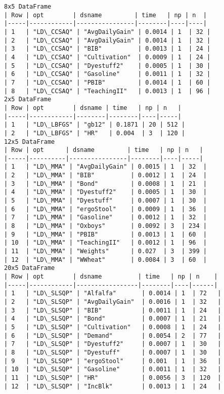 \documentclass{article}
\begin{document}
    \begin{Verbatim}[commandchars=\\\{\}]
8x5 DataFrame
| Row | opt        | dsname         | time   | np | n  |
|-----|------------|----------------|--------|----|----|
| 1   | "LD\_CCSAQ" | "AvgDailyGain" | 0.0014 | 1  | 32 |
| 2   | "LD\_CCSAQ" | "AvgDailyGain" | 0.0014 | 1  | 32 |
| 3   | "LD\_CCSAQ" | "BIB"          | 0.0013 | 1  | 24 |
| 4   | "LD\_CCSAQ" | "Cultivation"  | 0.0009 | 1  | 24 |
| 5   | "LD\_CCSAQ" | "Dyestuff2"    | 0.0005 | 1  | 30 |
| 6   | "LD\_CCSAQ" | "Gasoline"     | 0.0011 | 1  | 32 |
| 7   | "LD\_CCSAQ" | "PBIB"         | 0.0014 | 1  | 60 |
| 8   | "LD\_CCSAQ" | "TeachingII"   | 0.0013 | 1  | 96 |
2x5 DataFrame
| Row | opt        | dsname | time   | np | n   |
|-----|------------|--------|--------|----|-----|
| 1   | "LD\_LBFGS" | "gb12" | 0.1871 | 20 | 512 |
| 2   | "LD\_LBFGS" | "HR"   | 0.004  | 3  | 120 |
12x5 DataFrame
| Row | opt      | dsname         | time   | np | n   |
|-----|----------|----------------|--------|----|-----|
| 1   | "LD\_MMA" | "AvgDailyGain" | 0.0015 | 1  | 32  |
| 2   | "LD\_MMA" | "BIB"          | 0.0012 | 1  | 24  |
| 3   | "LD\_MMA" | "Bond"         | 0.0008 | 1  | 21  |
| 4   | "LD\_MMA" | "Dyestuff2"    | 0.0005 | 1  | 30  |
| 5   | "LD\_MMA" | "Dyestuff"     | 0.0007 | 1  | 30  |
| 6   | "LD\_MMA" | "ergoStool"    | 0.0009 | 1  | 36  |
| 7   | "LD\_MMA" | "Gasoline"     | 0.0012 | 1  | 32  |
| 8   | "LD\_MMA" | "Oxboys"       | 0.0092 | 3  | 234 |
| 9   | "LD\_MMA" | "PBIB"         | 0.0013 | 1  | 60  |
| 10  | "LD\_MMA" | "TeachingII"   | 0.0012 | 1  | 96  |
| 11  | "LD\_MMA" | "Weights"      | 0.027  | 3  | 399 |
| 12  | "LD\_MMA" | "WWheat"       | 0.0084 | 3  | 60  |
20x5 DataFrame
| Row | opt        | dsname          | time   | np | n    |
|-----|------------|-----------------|--------|----|------|
| 1   | "LD\_SLSQP" | "Alfalfa"       | 0.0014 | 1  | 72   |
| 2   | "LD\_SLSQP" | "AvgDailyGain"  | 0.0016 | 1  | 32   |
| 3   | "LD\_SLSQP" | "BIB"           | 0.0011 | 1  | 24   |
| 4   | "LD\_SLSQP" | "Bond"          | 0.0007 | 1  | 21   |
| 5   | "LD\_SLSQP" | "Cultivation"   | 0.0008 | 1  | 24   |
| 6   | "LD\_SLSQP" | "Demand"        | 0.0054 | 2  | 77   |
| 7   | "LD\_SLSQP" | "Dyestuff2"     | 0.0007 | 1  | 30   |
| 8   | "LD\_SLSQP" | "Dyestuff"      | 0.0007 | 1  | 30   |
| 9   | "LD\_SLSQP" | "ergoStool"     | 0.001  | 1  | 36   |
| 10  | "LD\_SLSQP" | "Gasoline"      | 0.0011 | 1  | 32   |
| 11  | "LD\_SLSQP" | "HR"            | 0.0056 | 3  | 120  |
| 12  | "LD\_SLSQP" | "IncBlk"        | 0.0013 | 1  | 24   |

\end{Verbatim}
\end{document}
